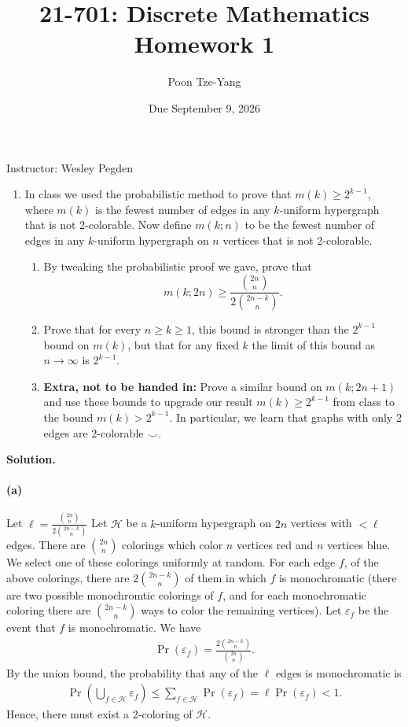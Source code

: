 \documentclass[11pt,letterpaper]{article}
\title{21-701: Discrete Mathematics \\ Homework 1}
\author{Poon Tze-Yang}
\date{Due September 9, 2026}
\theoremstyle{definition}
\newcommand{\calH}{\mathcal{H}}
\newcommand{\solution}{\medskip\noindent\textbf{Solution.}\par\medskip}
\begin{document}
\maketitle

\noindent Instructor: Wesley Pegden

\begin{enumerate}
\item In class we used the probabilistic method to prove that $m(k) \geq 2^{k-1}$, where $m(k)$ is the fewest number of edges in any $k$-uniform hypergraph that is not 2-colorable. Now define $m(k;n)$ to be the fewest number of edges in any $k$-uniform hypergraph on $n$ vertices that is not 2-colorable.
\begin{enumerate}
\item By tweaking the probabilistic proof we gave, prove that
\[
m(k;2n) \geq \frac{\binom{2n}{n}}{2\binom{2n-k}{n}}.
\]
\item Prove that for every $n \geq k \geq 1$, this bound is stronger than the $2^{k-1}$ bound on $m(k)$, but that for any fixed $k$ the limit of this bound as $n \to \infty$ is $2^{k-1}$.
\item \textbf{Extra, not to be handed in:} Prove a similar bound on $m(k;2n+1)$ and use these bounds to upgrade our result $m(k) \geq 2^{k-1}$ from class to the bound $m(k) > 2^{k-1}$. In particular, we learn that graphs with only 2 edges are 2-colorable $\smile$.
\end{enumerate}
\end{enumerate}

\solution
\paragraph{(a)} 
Let $\ell = \frac{\binom{2n}{n}}{2\binom{2n-k}{n}}$ Let $\calH$ be a $k$-uniform hypergraph on $2n$ vertices with $<\ell$ edges. 
There are $\binom{2n}{n}$ colorings which color $n$ vertices red and $n$ vertices blue.
We select one of these colorings uniformly at random.
For each edge $f$, of the above colorings, there are $2\binom{2n-k}{n}$ of them in which $f$ is monochromatic (there are two possible monochromtic colorings of $f$, and for each monochromatic coloring there are $\binom{2n-k}{n}$ ways to color the remaining vertices).
Let $\varepsilon_f$ be the event that $f$ is monochromatic. We have
\begin{align*}
    \Pr(\varepsilon_f) = \frac{2\binom{2n-k}{n}}{\binom{2n}{n}}.
\end{align*}
By the union bound, the probability that any of the $\ell$ edges is monochromatic is
\begin{align*}
    \Pr\left(\bigcup_{f\in\calH}\varepsilon_f\right) \leq \sum_{f\in \calH} \Pr\left(\varepsilon_f\right) = \ell  \Pr(\varepsilon_f)<1.
\end{align*} 
Hence, there must exist a 2-coloring of $\calH$.
\end{document}
